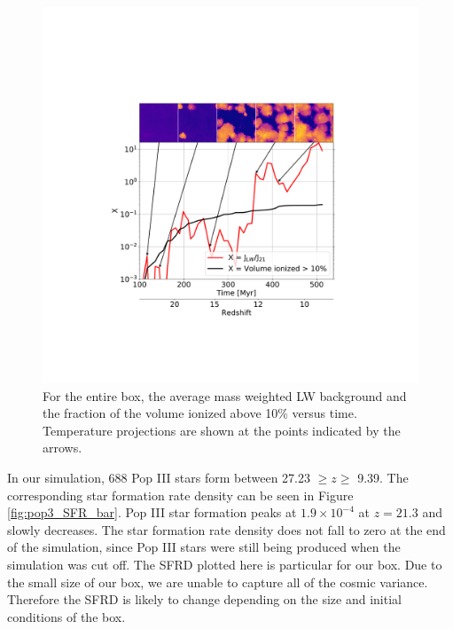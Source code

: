 \documentclass[a4paper,fleqn,usenatbib]{mnras}
\begin{document}
\begin{figure}
	\includegraphics[width=\columnwidth]{images/JLW_xe_mass.pdf}
    \caption{For the entire box, the average mass weighted LW background and the fraction of the volume ionized above 10\% versus time. Temperature projections are shown at the points indicated by the arrows.}
    \label{fig:JLW_xe_mass}
\end{figure}

In our simulation, 688 Pop III stars form between 27.23 $\geq z \geq$ 9.39. The corresponding star formation rate density can be seen in Figure \ref{fig:pop3_SFR_bar}. Pop III star formation peaks at $1.9 \times 10^{-4}$ at $z = 21.3$ and slowly decreases. The star formation rate density does not fall to zero at the end of the simulation, since Pop III stars were still being produced when the simulation was cut off. The SFRD plotted here is particular for our box. Due to the small size of our box, we are unable to capture all of the cosmic variance. Therefore the SFRD is likely to change depending on the size and initial conditions of the box.
\end{document}

